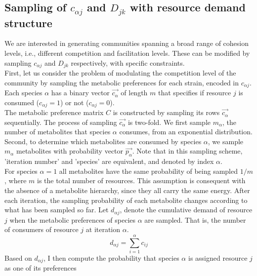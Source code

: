 \documentclass[12pt]{article}
\begin{document}
        \subsection{Sampling of $ c_{{\alpha}j} $ and $ D_{jk }$ with resource demand structure}\label{sampling}
	
        	We are interested in generating communities spanning a broad range of cohesion levels, i.e., different competition and facilitation levels. These can be modified by sampling $ c_{{\alpha}j} $ and $ D_{jk} $ respectively, with specific constraints.\\
        
        	First, let us consider the problem of modulating the competition level of the community by sampling the metabolic preferences for each strain, encoded in  $ c_{{\alpha}j} $. Each species $ {\alpha} $ has a binary vector $ \vec{c_{\alpha}} $ of length $ m $ that specifies if resource $ j $ is consumed ($ c_{{\alpha}j} = 1 $) or not ($ c_{{\alpha}j} = 0 $). \\
        	The metabolic preference matrix $ C $ is constructed by sampling its rows $ \vec{c_{\alpha}} $ sequentially. The process of sampling $ \vec{c_{\alpha}} $ is two-fold. We first sample $ m_{\alpha} $, the number of metabolites that species $ {\alpha} $ consumes, from an exponential distribution. Second, to determine which metabolites are consumed by species $ {\alpha} $, we sample $ m_{\alpha} $ metabolites with probability vector $ \vec{p_{\alpha}} $. Note that in this sampling scheme, 'iteration number' and 'species' are equivalent, and denoted by index ${\alpha}$.\\
        	For species $ {\alpha} = 1 $ all metabolites have the same probability of being sampled $ 1/m $, where $ m $ is the total number of resources. This assumption is consequent with the absence of a metabolite hierarchy, since they all carry the same energy. After each iteration, the sampling probability of each metabolite changes according to what has been sampled so far. Let $ d_{{\alpha}j} $, denote the cumulative demand of resource $ j $ when the metabolic preferences of species $ {\alpha} $ are sampled. That is, the number of consumers of resource $ j $ at iteration $ {\alpha} $.
        	\begin{equation}
        		d_{{\alpha}j}  = \sum_{i = 1}^{{\alpha}}c_{ij}
        	\end{equation}
        	Based on $ d_{{\alpha}j} $, I then compute the probability that species $ {\alpha} $ is assigned resource $ j $ as one of its preferences
\end{document}
